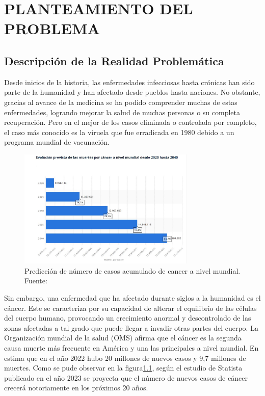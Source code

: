 \chapter{PLANTEAMIENTO DEL PROBLEMA}
\section{Descripción de la Realidad Problemática}

Desde inicios de la historia, las enfermedades infecciosas hasta crónicas han sido parte de la humanidad y han afectado desde pueblos hasta naciones. No obstante, gracias al avance de la medicina se ha podido comprender muchas de estas enfermedades, logrando mejorar la salud de muchas personas o su completa recuperación. Pero en el mejor de los casos eliminada o controlada por completo, el caso más conocido es la viruela que fue erradicada en 1980 debido a un programa mundial de vacunación. 


\begin{figure}[h]
	\begin{center}
		\includegraphics[width=0.75\textwidth]{1/figures/Grafico1DiagnosnitoCancer.JPG}
		\caption{Predicción de número de casos acumulado de cancer a nivel mundial. Fuente: \cite{stadisitc_cancer}}
		\label{1:fig}
	\end{center}
\end{figure}


Sin embargo, una enfermedad que ha afectado durante siglos a la humanidad es el cáncer. Este se caracteriza por su capacidad de alterar el equilibrio de las células del cuerpo humano, provocando un crecimiento anormal y descontrolado de las zonas afectadas a tal grado que puede llegar a invadir otras partes del cuerpo. La Organización mundial de la salud (OMS) afirma que el cáncer es la segunda causa muerte más frecuente en América y una las principales a nivel mundial. En estima que en el año 2022 hubo 20 millones de nuevos casos y 9,7 millones de muertes. Como se pude observar en la figura\ref{1:fig}, según el estudio de Statista publicado en el año 2023 se proyecta que el número de nuevos casos de cáncer crecerá notoriamente en los próximos 20 años.\parencite{OMS_cancer}






